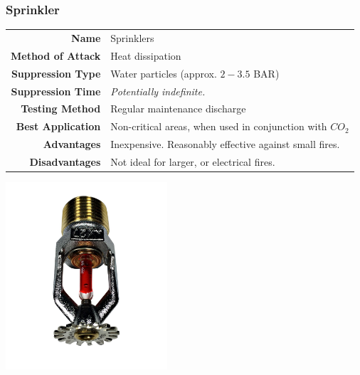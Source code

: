 \documentclass[11pt,a4paper]{article}
\begin{document}
\subsubsection{Sprinkler}
\begin{tabular}{|r|l|}
\hline
\textbf{Name} & Sprinklers\\
\textbf{Method of Attack} & Heat dissipation\\
\textbf{Suppression Type} & Water particles (approx. $2-3.5$ BAR)  \\
\textbf{Suppression Time} & \textit{Potentially indefinite.}\\
\textbf{Testing Method} & Regular maintenance discharge\\
\textbf{Best Application} & Non-critical areas, when used in conjunction with $CO_2$\\
\textbf{Advantages} & Inexpensive. Reasonably effective against small fires. \\
\textbf{Disadvantages} & Not ideal for larger, or electrical fires.\\
\hline
\end{tabular}
\begin{center}
\includegraphics[width=6cm]{sprinkler.jpg}
\end{center}
\end{document}
